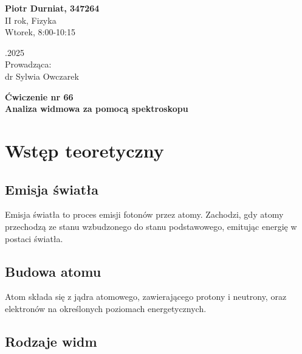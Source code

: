 \documentclass[a4paper,12pt]{article}
\begin{document}
\noindent
\begin{minipage}{0.5\textwidth}
    \raggedright
    \textbf{Piotr Durniat, 347264} \\
    II rok, Fizyka \\
    Wtorek, 8:00-10:15 \\
    \vspace{0.5cm}
    \vspace{0.5cm}
\end{minipage}%
\begin{minipage}{0.5\textwidth}
    .2025 \\
    \vspace{0.5cm}
    Prowadząca: \\
    dr Sylwia Owczarek
\end{minipage}

\vspace{2cm}
\begin{center}
    \LARGE \textbf{Ćwiczenie nr 66} \\[0.5cm]
    \Large \textbf{Analiza widmowa za pomocą spektroskopu}
\end{center}

\vspace{1cm} %
\noindent

\tableofcontents
\newpage

\section{Wstęp teoretyczny}

\subsection*{Emisja światła}

Emisja światła to proces emisji fotonów przez atomy. Zachodzi, gdy atomy przechodzą ze stanu wzbudzonego do stanu podstawowego, emitując energię w postaci światła.~\citep{Drynski1976}

\subsection*{Budowa atomu}

Atom składa się z jądra atomowego, zawierającego protony i neutrony, oraz elektronów na określonych poziomach energetycznych.~\citep{Drynski1976}

\subsection*{Rodzaje widm}
\end{document}
